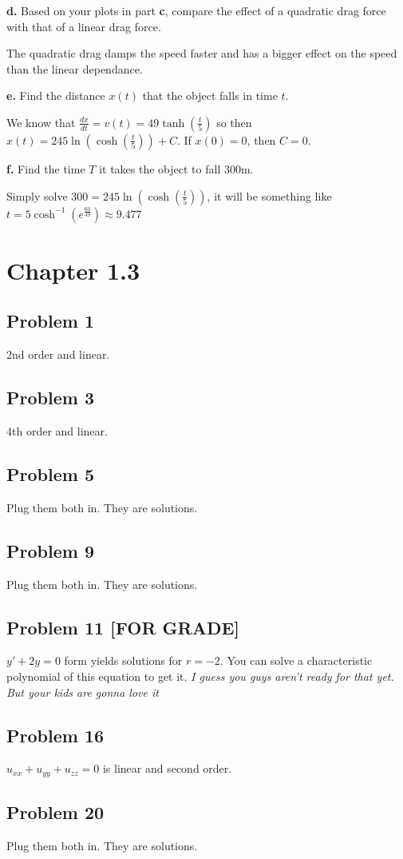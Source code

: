 \documentclass[12pt]{article}
\begin{document}
\textbf{d.} Based on your plots in part \textbf{c}, compare the effect of a quadratic drag
force with that of a linear drag force. 

The quadratic drag damps the speed faster and has a bigger effect on the
speed than the linear dependance.

\textbf{e.} Find the distance \(x(t)\) that the object falls in time \(t\).

We know that \(\frac{dx}{dt} = v(t) = 49\tanh(\frac{t}{5})\) so then
\(x(t) = 245\ln(\cosh(\frac{t}{5})) + C\). If \(x(0) = 0\), then \(C = 0\).

\textbf{f.} Find the time \(T\) it takes the object to fall 300m.

Simply solve \(300 = 245 \ln(\cosh(\frac{t}{5}))\), it will be something like
    \(t = 5\cosh^{-1}(e^{\frac{60}{49}}) \approx 9.477\)

\section*{Chapter 1.3}
\label{sec:org8235204}
\subsection*{Problem 1}
\label{sec:org1a7c332}
2nd order and linear.
\subsection*{Problem 3}
\label{sec:org6228274}
4th order and linear.
\subsection*{Problem 5}
\label{sec:orgc66051a}
Plug them both in. They are solutions.
\subsection*{Problem 9}
\label{sec:orgfddf949}
Plug them both in. They are solutions.
\subsection*{Problem 11 [FOR GRADE]}
\label{sec:org10d5088}
\(y'+2y=0\) form yields solutions for \(r=-2\). You can solve a characteristic
polynomial of this equation to get it.
\emph{I guess you guys aren't ready for that yet. But your kids are gonna love it}

\subsection*{Problem 16}
\label{sec:orgd1a5b08}
\(u_{xx} + u_{yy} + u_{zz} = 0\) is linear and second order.  

\subsection*{Problem 20}
\label{sec:org4e73e15}
Plug them both in. They are solutions.
\end{document}
